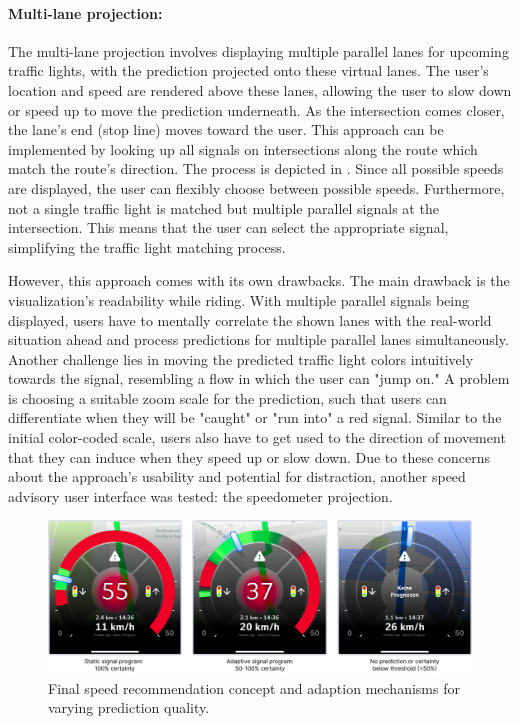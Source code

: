 \paragraph{Multi-lane projection:} The multi-lane projection involves displaying multiple parallel lanes for upcoming traffic lights, with the prediction projected onto these virtual lanes. The user's location and speed are rendered above these lanes, allowing the user to slow down or speed up to move the prediction underneath. As the intersection comes closer, the lane's end (stop line) moves toward the user. This approach can be implemented by looking up all signals on intersections along the route which match the route's direction. The process is depicted in . Since all possible speeds are displayed, the user can flexibly choose between possible speeds. Furthermore, not a single traffic light is matched but multiple parallel signals at the intersection. This means that the user can select the appropriate signal, simplifying the traffic light matching process.

However, this approach comes with its own drawbacks. The main drawback is the visualization's readability while riding. With multiple parallel signals being displayed, users have to mentally correlate the shown lanes with the real-world situation ahead and process predictions for multiple parallel lanes simultaneously. Another challenge lies in moving the predicted traffic light colors intuitively towards the signal, resembling a flow in which the user can "jump on." A problem is choosing a suitable zoom scale for the prediction, such that users can differentiate when they will be "caught" or "run into" a red signal. Similar to the initial color-coded scale, users also have to get used to the direction of movement that they can induce when they speed up or slow down. Due to these concerns about the approach's usability and potential for distraction, another speed advisory user interface was tested: the speedometer projection.

\begin{figure}[htbp]
\centering
\includegraphics[width=\linewidth]{images/speedometer-adaptions.png}
\caption{Final speed recommendation concept and adaption mechanisms for varying prediction quality.}
\label{fig:speedometer-adaptions}
\end{figure}

